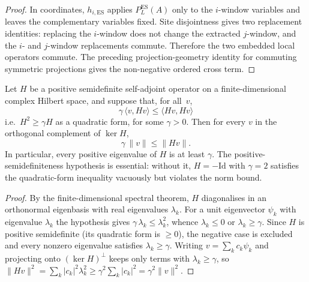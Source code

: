 \begin{proof}
    \leanok
    In coordinates, $h_{i,\mathrm{ES}}$ applies $P_L^{\mathrm{ES}}(A)$ only to the
    $i$-window variables and leaves the complementary variables fixed. Site
    disjointness gives two replacement identities: replacing the $i$-window does
    not change the extracted $j$-window, and the $i$- and $j$-window replacements
    commute. Therefore the two embedded local operators commute. The preceding
    projection-geometry identity for commuting symmetric projections gives the
    non-negative ordered cross term.
\end{proof}

\begin{lemma}\label{lem:quadratic_form_to_norm_bound}
    \leanok
    Let $H$ be a positive semidefinite self-adjoint operator on a
    finite-dimensional complex Hilbert space, and suppose that, for all~$v$,
    \[
        \gamma\,\langle v, H v\rangle \le \langle H v, H v\rangle
    \]
    i.e.\ $H^2 \ge \gamma H$ as a quadratic form, for some $\gamma > 0$.
    Then for every $v$ in the orthogonal complement of $\ker H$,
    \[
        \gamma\,\|v\| \le \|H v\|.
    \]
    In particular, every positive eigenvalue of $H$ is at least $\gamma$.
    The positive-semidefiniteness hypothesis is essential: without it,
    $H = -\mathrm{Id}$ with $\gamma = 2$ satisfies the quadratic-form
    inequality vacuously but violates the norm bound.
\end{lemma}

\begin{proof}
    \leanok
    By the finite-dimensional spectral theorem, $H$ diagonalises in an
    orthonormal eigenbasis with real eigenvalues $\lambda_k$. For a unit
    eigenvector $\psi_k$ with eigenvalue $\lambda_k$ the hypothesis
    gives $\gamma\,\lambda_k \le \lambda_k^2$, whence $\lambda_k \le 0$
    or $\lambda_k \ge \gamma$. Since $H$ is positive semidefinite
    (its quadratic form is $\ge 0$), the negative case is excluded and
    every nonzero eigenvalue satisfies $\lambda_k \ge \gamma$. Writing
    $v = \sum_k c_k \psi_k$ and projecting onto $(\ker H)^{\perp}$
    keeps only terms with $\lambda_k \ge \gamma$, so
    $\|H v\|^2 = \sum_k |c_k|^2 \lambda_k^2
        \ge \gamma^2 \sum_k |c_k|^2 = \gamma^2 \|v\|^2$.
\end{proof}
